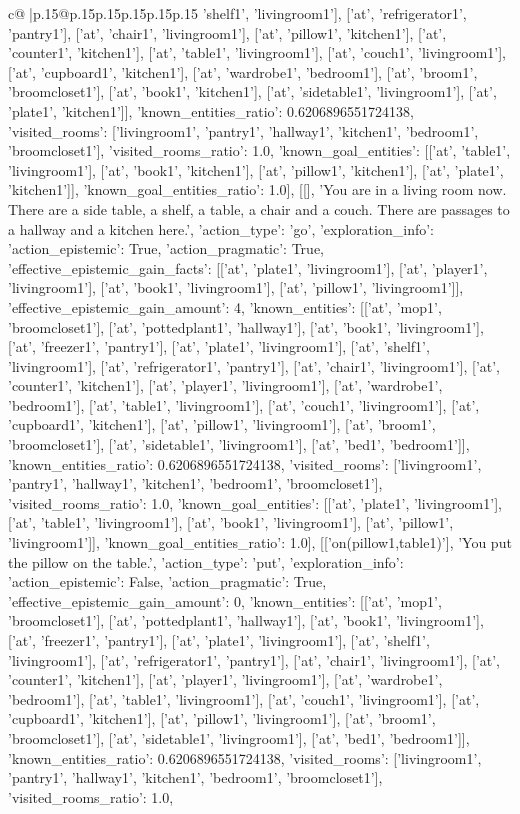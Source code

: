 \documentclass{article}
\begin{document}
{\begin{supertabular}{c@{$\;$}|p{.15\linewidth}@{}p{.15\linewidth}p{.15\linewidth}p{.15\linewidth}p{.15\linewidth}p{.15\linewidth}}
{{{'shelf1', 'livingroom1'], ['at', 'refrigerator1', 'pantry1'], ['at', 'chair1', 'livingroom1'], ['at', 'pillow1', 'kitchen1'], ['at', 'counter1', 'kitchen1'], ['at', 'table1', 'livingroom1'], ['at', 'couch1', 'livingroom1'], ['at', 'cupboard1', 'kitchen1'], ['at', 'wardrobe1', 'bedroom1'], ['at', 'broom1', 'broomcloset1'], ['at', 'book1', 'kitchen1'], ['at', 'sidetable1', 'livingroom1'], ['at', 'plate1', 'kitchen1']], 'known_entities_ratio': 0.6206896551724138, 'visited_rooms': ['livingroom1', 'pantry1', 'hallway1', 'kitchen1', 'bedroom1', 'broomcloset1'], 'visited_rooms_ratio': 1.0, 'known_goal_entities': [['at', 'table1', 'livingroom1'], ['at', 'book1', 'kitchen1'], ['at', 'pillow1', 'kitchen1'], ['at', 'plate1', 'kitchen1']], 'known_goal_entities_ratio': 1.0}}], [[], 'You are in a living room now. There are a side table, a shelf, a table, a chair and a couch. There are passages to a hallway and a kitchen here.', {'action_type': 'go', 'exploration_info': {'action_epistemic': True, 'action_pragmatic': True, 'effective_epistemic_gain_facts': [['at', 'plate1', 'livingroom1'], ['at', 'player1', 'livingroom1'], ['at', 'book1', 'livingroom1'], ['at', 'pillow1', 'livingroom1']], 'effective_epistemic_gain_amount': 4, 'known_entities': [['at', 'mop1', 'broomcloset1'], ['at', 'pottedplant1', 'hallway1'], ['at', 'book1', 'livingroom1'], ['at', 'freezer1', 'pantry1'], ['at', 'plate1', 'livingroom1'], ['at', 'shelf1', 'livingroom1'], ['at', 'refrigerator1', 'pantry1'], ['at', 'chair1', 'livingroom1'], ['at', 'counter1', 'kitchen1'], ['at', 'player1', 'livingroom1'], ['at', 'wardrobe1', 'bedroom1'], ['at', 'table1', 'livingroom1'], ['at', 'couch1', 'livingroom1'], ['at', 'cupboard1', 'kitchen1'], ['at', 'pillow1', 'livingroom1'], ['at', 'broom1', 'broomcloset1'], ['at', 'sidetable1', 'livingroom1'], ['at', 'bed1', 'bedroom1']], 'known_entities_ratio': 0.6206896551724138, 'visited_rooms': ['livingroom1', 'pantry1', 'hallway1', 'kitchen1', 'bedroom1', 'broomcloset1'], 'visited_rooms_ratio': 1.0, 'known_goal_entities': [['at', 'plate1', 'livingroom1'], ['at', 'table1', 'livingroom1'], ['at', 'book1', 'livingroom1'], ['at', 'pillow1', 'livingroom1']], 'known_goal_entities_ratio': 1.0}}], [['on(pillow1,table1)'], 'You put the pillow on the table.', {'action_type': 'put', 'exploration_info': {'action_epistemic': False, 'action_pragmatic': True, 'effective_epistemic_gain_amount': 0, 'known_entities': [['at', 'mop1', 'broomcloset1'], ['at', 'pottedplant1', 'hallway1'], ['at', 'book1', 'livingroom1'], ['at', 'freezer1', 'pantry1'], ['at', 'plate1', 'livingroom1'], ['at', 'shelf1', 'livingroom1'], ['at', 'refrigerator1', 'pantry1'], ['at', 'chair1', 'livingroom1'], ['at', 'counter1', 'kitchen1'], ['at', 'player1', 'livingroom1'], ['at', 'wardrobe1', 'bedroom1'], ['at', 'table1', 'livingroom1'], ['at', 'couch1', 'livingroom1'], ['at', 'cupboard1', 'kitchen1'], ['at', 'pillow1', 'livingroom1'], ['at', 'broom1', 'broomcloset1'], ['at', 'sidetable1', 'livingroom1'], ['at', 'bed1', 'bedroom1']], 'known_entities_ratio': 0.6206896551724138, 'visited_rooms': ['livingroom1', 'pantry1', 'hallway1', 'kitchen1', 'bedroom1', 'broomcloset1'], 'visited_rooms_ratio': 1.0, }}}
\end{supertabular}}
\end{document}
